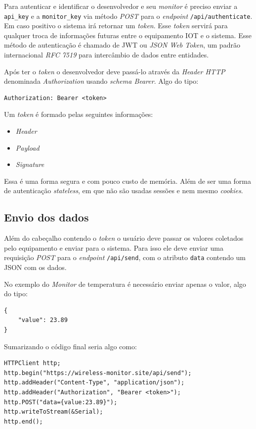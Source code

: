 Para autenticar e identificar o desenvolvedor e seu \emph{monitor} é
preciso enviar a \texttt{api\_key} e a \texttt{monitor\_key} via método
\emph{POST} para o \emph{endpoint} \texttt{/api/authenticate}. Em caso
positivo o sistema irá retornar um \emph{token}. Esse \emph{token}
servirá para qualquer troca de informações futuras entre o equipamento
IOT e o sistema. Esse método de autenticação é chamado de JWT ou
\emph{JSON Web Token}, um padrão internacional \emph{RFC 7519} para
intercâmbio de dados entre entidades.

Após ter o \emph{token} o desenvolvedor deve passá-lo através da
\emph{Header HTTP} denominada \emph{Authorization} usando \emph{schema
Bearer}. Algo do tipo:

\begin{verbatim}
Authorization: Bearer <token>
\end{verbatim}

Um \emph{token} é formado pelas seguintes informações:

\begin{itemize}
\itemsep1pt\parskip0pt
\item
  \emph{Header}
\item
  \emph{Payload}
\item
  \emph{Signature}
\end{itemize}

Essa é uma forma segura e com pouco custo de memória. Além de ser uma
forma de autenticação \emph{stateless}, em que não são usadas sessões e
nem mesmo \emph{cookies}.

\subsection{Envio dos dados}\label{envio-dos-dados}

Além do cabeçalho contendo o \emph{token} o usuário deve passar os
valores coletados pelo equipamento e enviar para o sistema. Para isso
ele deve enviar uma requisição \emph{POST} para o \emph{endpoint}
\texttt{/api/send}, com o atributo \texttt{data} contendo um JSON com os
dados.

No exemplo do \emph{Monitor} de temperatura é necessário enviar apenas o
valor, algo do tipo:

\begin{verbatim}
{
    "value": 23.89
}
\end{verbatim}

Sumarizando o código final seria algo como:

\begin{verbatim}
HTTPClient http;
http.begin("https://wireless-monitor.site/api/send");
http.addHeader("Content-Type", "application/json");
http.addHeader("Authorization", "Bearer <token>");
http.POST("data={value:23.89}");
http.writeToStream(&Serial);
http.end();
\end{verbatim}

